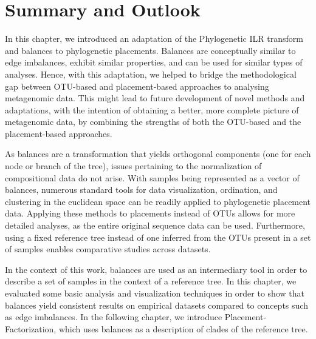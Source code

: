 
\section{Summary and Outlook}
\label{ch:Balances:sec:SummaryOutlook}

In this chapter, we introduced an adaptation of the Phylogenetic ILR transform and balances \cite{Silverman2017}
to phylogenetic placements.
Balances are conceptually similar to edge imbalances, exhibit similar properties, 
and can be used for similar types of analyses.
Hence, with this adaptation, we helped to bridge the methodological gap 
between OTU-based and placement-based approaches to analysing metagenomic data.
This might lead to future development of novel methods and adaptations,
with the intention of obtaining a better, more complete picture of metagenomic data,
by combining the strengths of both the OTU-based and the placement-based approaches.

As balances are a transformation that yields orthogonal components (one for each node or branch of the tree),
issues pertaining to the normalization of compositional data do not arise.
With samples being represented as a vector of balances,
numerous standard tools for data visualization, ordination, and clustering in the euclidean space
can be readily applied to phylogenetic placement data.
Applying these methods to placements instead of OTUs allows for more detailed analyses,
as the entire original sequence data can be used.
Furthermore, using a fixed reference tree instead of one inferred from the OTUs present in a set of samples
enables comparative studies across datasets.

In the context of this work, balances are used as an intermediary tool
in order to describe a set of samples in the context of a reference tree.
In this chapter, we evaluated some basic analysis and visualization techniques in order to show
that balances yield consistent results on empirical datasets compared to concepts such as edge imbalances.
In the following chapter, we introduce Placement-Factorization,
which uses balances as a description of clades of the reference tree.




